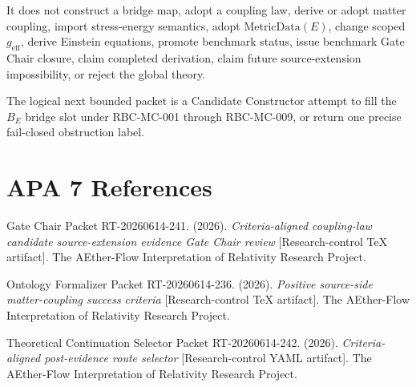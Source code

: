 \documentclass[11pt]{article}
\newcommand{\MetricData}{\mathrm{MetricData}}
\newcommand{\geff}{g_{\mathrm{eff}}}
\begin{document}
It does not construct a bridge map, adopt a coupling law, derive or adopt
matter coupling, import stress-energy semantics, adopt \(\MetricData(E)\),
change scoped \(\geff\), derive Einstein equations, promote benchmark status,
issue benchmark Gate Chair closure, claim completed derivation, claim future
source-extension impossibility, or reject the global theory.

The logical next bounded packet is a Candidate Constructor attempt to fill the
\(B_E\) bridge slot under RBC-MC-001 through RBC-MC-009, or return one precise
fail-closed obstruction label.

\section{APA 7 References}

Gate Chair Packet RT-20260614-241. (2026). \emph{Criteria-aligned
coupling-law candidate source-extension evidence Gate Chair review}
[Research-control TeX artifact]. The AEther-Flow Interpretation of Relativity
Research Project.

Ontology Formalizer Packet RT-20260614-236. (2026). \emph{Positive
source-side matter-coupling success criteria} [Research-control TeX artifact].
The AEther-Flow Interpretation of Relativity Research Project.

Theoretical Continuation Selector Packet RT-20260614-242. (2026).
\emph{Criteria-aligned post-evidence route selector} [Research-control YAML
artifact]. The AEther-Flow Interpretation of Relativity Research Project.
\end{document}
